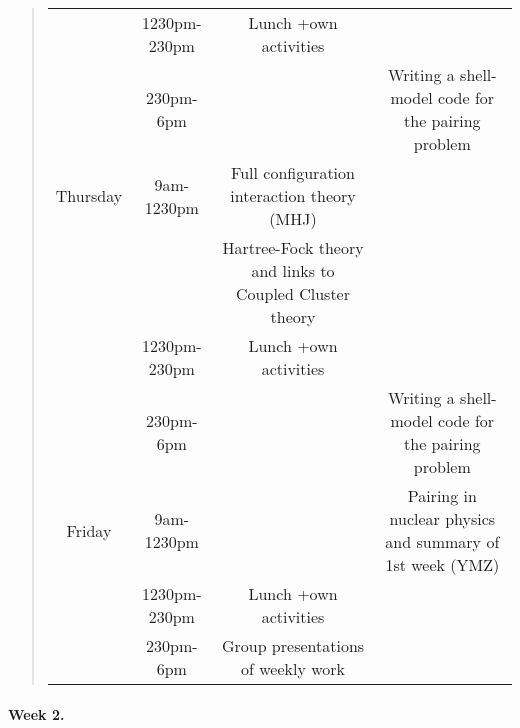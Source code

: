 \documentclass[%
oneside,                 %
final,                   %
10pt]{article}
\begin{document}
\begin{quote}
\begin{tabular}{cccc}
          & 1230pm-230pm  & Lunch +own activities                                                    &                                                                \\
          & 230pm-6pm     &                                                                          & Writing a shell-model code for the pairing problem             \\
\hline
Thursday  & 9am-1230pm    & Full configuration interaction theory (MHJ)                              &                                                                \\
          &               & Hartree-Fock theory and links to Coupled Cluster theory                  &                                                                \\
          & 1230pm-230pm  & Lunch +own activities                                                    &                                                                \\
          & 230pm-6pm     &                                                                          & Writing a shell-model code for the pairing problem             \\
\hline
Friday    & 9am-1230pm    &                                                                          & Pairing in nuclear physics and summary of 1st week (YMZ)       \\
          & 1230pm-230pm  & Lunch +own activities                                                    &                                                                \\
          & 230pm-6pm     & Group presentations of weekly work                                       &                                                                \\
\hline
\end{tabular}
\end{quote}

\noindent


\paragraph{Week 2.}
\end{document}
